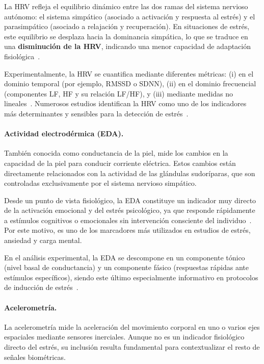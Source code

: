 \documentclass{report}
\begin{document}
La HRV refleja el equilibrio dinámico entre las dos ramas del sistema nervioso autónomo: el sistema simpático (asociado a activación y respuesta al estrés) y el parasimpático (asociado a relajación y recuperación).  
En situaciones de estrés, este equilibrio se desplaza hacia la dominancia simpática, lo que se traduce en una \textbf{disminución de la HRV}, indicando una menor capacidad de adaptación fisiológica~\cite{Kim2018}.

Experimentalmente, la HRV se cuantifica mediante diferentes métricas:  
(i) en el dominio temporal (por ejemplo, RMSSD o SDNN),  
(ii) en el dominio frecuencial (componentes LF, HF y su relación LF/HF),  
y (iii) mediante medidas no lineales~\cite{Shaffer2017}.  
Numerosos estudios identifican la HRV como uno de los indicadores más determinantes y sensibles para la detección de estrés~\cite{Kim2018,abd2024wearable}.

\paragraph{Actividad electrodérmica (EDA).}
También conocida como conductancia de la piel, mide los cambios en la capacidad de la piel para conducir corriente eléctrica.  
Estos cambios están directamente relacionados con la actividad de las glándulas sudoríparas, que son controladas exclusivamente por el sistema nervioso simpático.

Desde un punto de vista fisiológico, la EDA constituye un indicador muy directo de la activación emocional y del estrés psicológico, ya que responde rápidamente a estímulos cognitivos o emocionales sin intervención consciente del individuo~\cite{Boucsein2012}.  
Por este motivo, es uno de los marcadores más utilizados en estudios de estrés, ansiedad y carga mental.

En el análisis experimental, la EDA se descompone en un componente tónico (nivel basal de conductancia) y un componente fásico (respuestas rápidas ante estímulos específicos), siendo este último especialmente informativo en protocolos de inducción de estrés~\cite{Boucsein2012}.

\paragraph{Acelerometría.}
La acelerometría mide la aceleración del movimiento corporal en uno o varios ejes espaciales mediante sensores inerciales.  
Aunque no es un indicador fisiológico directo del estrés, su inclusión resulta fundamental para contextualizar el resto de señales biométricas.
\end{document}

